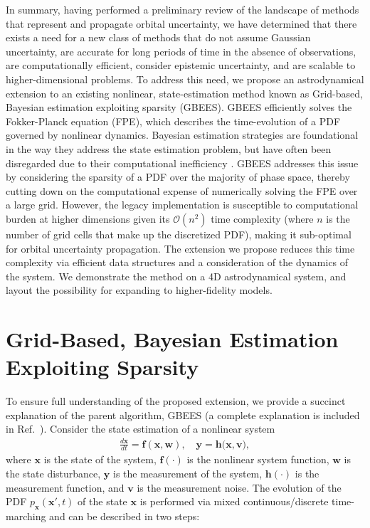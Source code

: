 \documentclass[paper,11pt]{AAS}
\begin{document}
In summary, having performed a preliminary review of the landscape of methods that represent and propagate orbital uncertainty, we have determined that there exists a need for a new class of methods that do not assume Gaussian uncertainty, are accurate for long periods of time in the absence of observations, are computationally efficient, consider epistemic uncertainty, and are scalable to higher-dimensional problems. To address this need, we propose an astrodynamical extension to an existing nonlinear, state-estimation method known as Grid-based, Bayesian estimation exploiting sparsity\cite{tB12} (GBEES). GBEES efficiently solves the Fokker-Planck equation (FPE), which describes the time-evolution of a PDF governed by nonlinear dynamics. Bayesian estimation strategies are foundational in the way they address the state estimation problem, but have often been disregarded due to their computational inefficiency \cite{mA02}. GBEES addresses this issue by considering the sparsity of a PDF over the majority of phase space, thereby cutting down on the computational expense of numerically solving the FPE over a large grid. However, the legacy implementation is susceptible to computational burden at higher dimensions given its $\mathcal{O}(n^2)$ time complexity (where $n$ is the number of grid cells that make up the discretized PDF), making it sub-optimal for orbital uncertainty propagation. The extension we propose reduces this time complexity via efficient data structures and a consideration of the dynamics of the system. We demonstrate the method on a 4D astrodynamical system, and layout the possibility for expanding to higher-fidelity models. 

\section{Grid-Based, Bayesian Estimation Exploiting Sparsity}

To ensure full understanding of the proposed extension, we provide a succinct explanation of the parent algorithm, GBEES (a complete explanation is included in Ref.~). Consider the state estimation of a nonlinear system
\begin{gather}\label{eq:NLsystem}
    \frac{d\mathbf{x}}{dt} = \mathbf{f}(\mathbf{x},\mathbf{w}), \quad \mathbf{y} = \mathbf{h(\mathbf{x}, \mathbf{v}}),
\end{gather}
\noindent where $\mathbf{x}$ is the state of the system, $\mathbf{f}(\cdot)$ is the nonlinear system function, $\mathbf{w}$ is the state disturbance, $\mathbf{y}$ is the measurement of the system, $\mathbf{h}(\cdot)$ is the measurement function, and $\mathbf{v}$ is the measurement noise. The evolution of the PDF $p_\mathbf{x}(\mathbf{x}',t)$ of the state $\mathbf{x}$ is performed via mixed continuous/discrete time-marching \cite{aJ70} and can be described in two steps:
\end{document}
